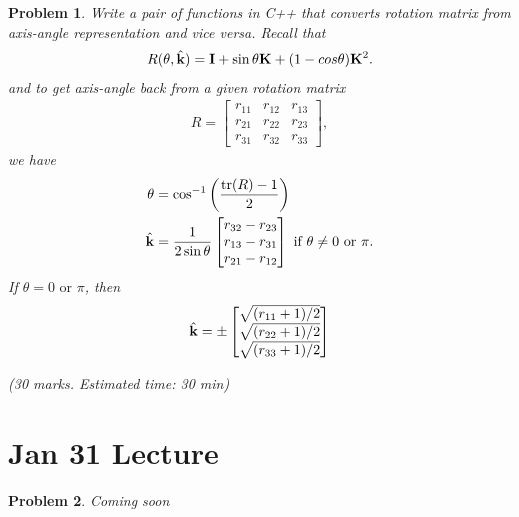 \documentclass[twocolumn]{article}
\newtheorem{prob}{Problem}
\begin{document}
\begin{prob}
  Write a pair of functions in C++ that converts rotation matrix from axis-angle
  representation and vice versa. Recall that
  \begin{align}
    R(\theta, \hat{\mathbf{k}}) = \mathbf{I} + \sin \theta \mathbf{K} + (1-cos \theta) \mathbf{K}^2.
  \end{align}
  and to get axis-angle back from a given rotation matrix
  \begin{align}
    R = \begin{bmatrix}
      r_{11} & r_{12} & r_{13} \\
      r_{21} & r_{22} & r_{23} \\
      r_{31} & r_{32} & r_{33}
      \end{bmatrix},
  \end{align}
  we have
  \begin{align}
    \theta &= \cos^{-1} \left(\frac{\text{tr}(R) - 1}{2}\right)
    \\
    \hat{\mathbf{k}} &= \frac{1}{2\sin\theta}\begin{bmatrix}
      r_{32} - r_{23} \\
      r_{13} - r_{31} \\
      r_{21} - r_{12}
      \end{bmatrix} \text{ if  } \theta \ne 0 \text{ or } \pi.
  \end{align}
 If $\theta = 0 \text{ or } \pi$, then
 \begin{align}
   \hat{\mathbf{k}} = \pm\begin{bmatrix}
    \sqrt{(r_{11} + 1)/2}\\
    \sqrt{(r_{22} + 1)/2}\\
    \sqrt{(r_{33} + 1)/2}
   \end{bmatrix}
   \end{align}
  
  (30 marks. Estimated time: 30 min)
  \label{prob:euler-to-rotmat}
\end{prob}


\section{Jan 31 Lecture}
\begin{prob}
  Coming soon
\end{prob}
\end{document}
